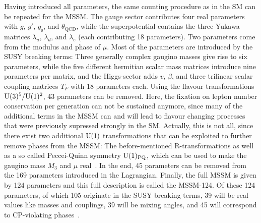 \noindent Having introduced all parameters, the same counting procedure as in the SM can be repeated for the MSSM. The gauge sector contributes four real parameters with $g$, $g'$, $g_\mathrm{s}$, and $\theta_\mathrm{QCD}$, while the superpotential contains the three Yukawa matrices $\lambda_u$, $\lambda_d$, and $\lambda_e$ (each contributing 18 parameters). Two parameters come from the modulus and phase of $\mu$.
Most of the parameters are introduced by the SUSY breaking terms: Three generally complex gaugino masses give rise to six parameters, while the five different hermitian scalar mass matrices introduce nine parameters per matrix, and the Higgs-sector adds $v$, $\beta$, and three trilinear scalar coupling matrices $T_F$ with 18 parameters each.
Using the flavour transformations $\mathrm{U}(3)^5/\mathrm{U}(1)^2$, 43 parameters can be removed. Here, the fixation on lepton number conservation per generation can not be sustained anymore, since many of the additional terms in the MSSM can and will lead to flavour changing processes that were previously supressed strongly in the SM.
Actually, this is not all, since there exist two additional $\mathrm{U}(1)$ transformations that can be exploited to further remove phases from the MSSM: The before-mentioned R-transformations as well as a so called Peccei-Quinn symmetry $\mathrm{U}(1)_\mathrm{PQ}$, which can be used to make the gaugino mass $M_3$ and $\mu$ real~\cite{haber}.
In the end, 45 parameters can be removed from the 169 parameters introduced in the Lagrangian.
Finally, the full MSSM is given by 124 parameters and this full description is called the MSSM-124. Of these 124 parameters, of which 105 originate in the SUSY breaking terms, 39 will be real values like masses and couplings, 39 will be mixing angles, and 45 will correspond to CP-violating phases~\cite{haber, pdg}.

